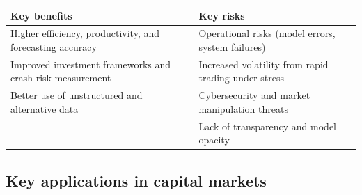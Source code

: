 \begin{cifigblock}
{\centering
\renewcommand{\arraystretch}{1.25}
\begin{tabularx}{\textwidth}{@{}>{\raggedright\arraybackslash}X >{\raggedright\arraybackslash}X@{}}
\toprule
\rowcolor{PaleNavy}
{\sffamily\bfseries\color{FRMNavy}Key benefits} &
{\sffamily\bfseries\color{FRMRed}Key risks}\\
\midrule
Higher efficiency, productivity, and forecasting accuracy &
Operational risks (model errors, system failures)\\
Improved investment frameworks and crash risk measurement &
Increased volatility from rapid trading under stress\\
Better use of unstructured and alternative data &
Cybersecurity and market manipulation threats\\
 & Lack of transparency and model opacity\\
\bottomrule
\end{tabularx}
\par}
\end{cifigblock}

\subsection*{Key applications in capital markets}

